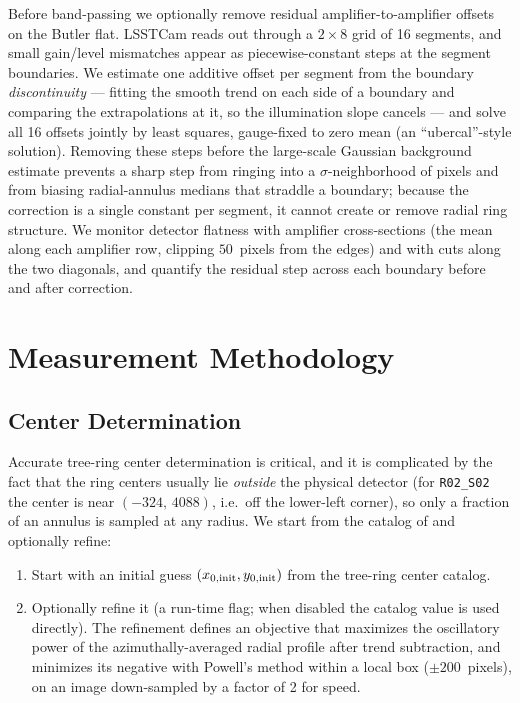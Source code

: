 Before band-passing we optionally remove residual amplifier-to-amplifier offsets on the Butler
flat. LSSTCam reads out through a $2\times8$ grid of 16 segments, and small gain/level
mismatches appear as piecewise-constant steps at the segment boundaries. We estimate one
additive offset per segment from the boundary \emph{discontinuity} — fitting the smooth trend
on each side of a boundary and comparing the extrapolations at it, so the illumination slope
cancels — and solve all 16 offsets jointly by least squares, gauge-fixed to zero mean
(an ``ubercal''-style solution). Removing these steps before the large-scale Gaussian background
estimate prevents a sharp step from ringing into a $\sigma$-neighborhood of pixels and from
biasing radial-annulus medians that straddle a boundary; because the correction is a single
constant per segment, it cannot create or remove radial ring structure. We monitor detector
flatness with amplifier cross-sections (the mean along each amplifier row, clipping $50$~pixels
from the edges) and with cuts along the two diagonals, and quantify the residual step across each
boundary before and after correction.

\section{Measurement Methodology} \label{sec:methods}

\subsection{Center Determination}

Accurate tree-ring center determination is critical, and it is complicated by the fact that
the ring centers usually lie \emph{outside} the physical detector (for \texttt{R02\_S02} the
center is near $(-324,\,4088)$, i.e.\ off the lower-left corner), so only a fraction of an
annulus is sampled at any radius. We start from the catalog of \citet{Park2020} and
optionally refine:

\begin{enumerate}
\item Start with an initial guess $(x_{0,\rm init}, y_{0,\rm init})$ from the \citet{Park2020}
tree-ring center catalog.
\item Optionally refine it (a run-time flag; when disabled the catalog value is used
directly). The refinement defines an objective that maximizes the oscillatory power of the
azimuthally-averaged radial profile after trend subtraction, and minimizes its negative with
Powell's method within a local box ($\pm 200$~pixels), on an image down-sampled by a factor
of 2 for speed.
\end{enumerate}

